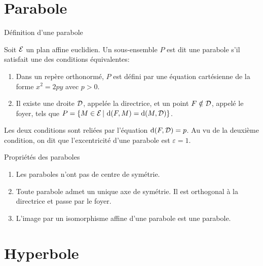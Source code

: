 \documentclass[11pt]{m53beamer}
\begin{document}
\section{Parabole}

\begin{frame}{Définition d'une parabole}
  \begin{defprop}
    Soit $\mathcal{E}$ un plan affine euclidien. Un sous-ensemble $P$ est dit une \alert{parabole} s'il satisfait une des conditions équivalentes:
    \begin{enumerate}[<+(1)->]
      \item Dans un repère orthonormé, $P$ est défini par une équation cartésienne de la forme $x^{2}=2py$ avec $p>0$.
      \item Il existe une droite $\mathcal{D}$, appelée \alert{la directrice}, et un point $F \notin \mathcal{D}$, appelé le \alert{foyer}, tels que $P = \{ M \in \mathcal{E} \,|\, \operatorname{d}(F,M)=\operatorname{d}(M,\mathcal{D})\}$.
    \end{enumerate}
  \end{defprop}\pause
  Les deux conditions sont reliées par l'équation $\operatorname{d}(F,\mathcal{D})=p$.\pause{}\newline
  Au vu de la deuxième condition, on dit que l'excentricité d'une parabole est $\varepsilon=1$.
\end{frame}
\begin{frame}{Propriétés des paraboles}
  \begin{enumerate}[<+(1)->]
    \item Les paraboles n'ont pas de centre de symétrie.
    \item Toute parabole admet un unique axe de symétrie. Il est orthogonal à la directrice et passe par le foyer.
    \item L'image par un isomorphisme affine d'une parabole est une parabole.
  \end{enumerate}
\end{frame}

\section{Hyperbole}
\end{document}
